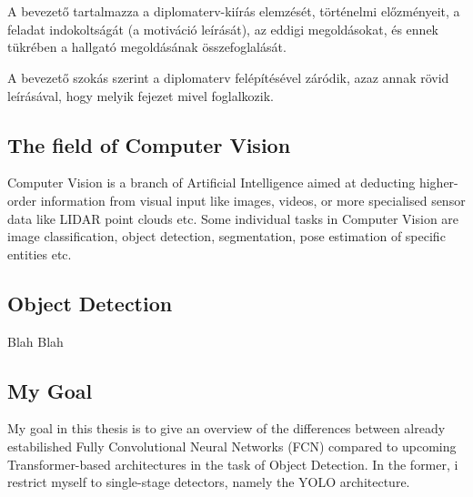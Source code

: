 \chapter{\bevezetes}

A bevezető tartalmazza a diplomaterv-kiírás elemzését, történelmi előzményeit, a feladat indokoltságát (a motiváció leírását), az eddigi megoldásokat, és ennek tükrében a hallgató megoldásának összefoglalását.

A bevezető szokás szerint a diplomaterv felépítésével záródik, azaz annak rövid leírásával, hogy melyik fejezet mivel foglalkozik.

\section{The field of Computer Vision}

Computer Vision is a branch of Artificial Intelligence aimed at deducting higher-order information from visual input like images, videos, or more specialised sensor data like LIDAR point clouds etc. Some individual tasks in Computer Vision are image classification, object detection, segmentation, pose estimation of specific entities etc.

\section{Object Detection}
Blah Blah

\section{My Goal}

My goal in this thesis is to give an overview of the differences between already estabilished Fully Convolutional Neural Networks (FCN) compared to upcoming Transformer-based architectures in the task of Object Detection. In the former, i restrict myself to single-stage detectors, namely the YOLO architecture.
